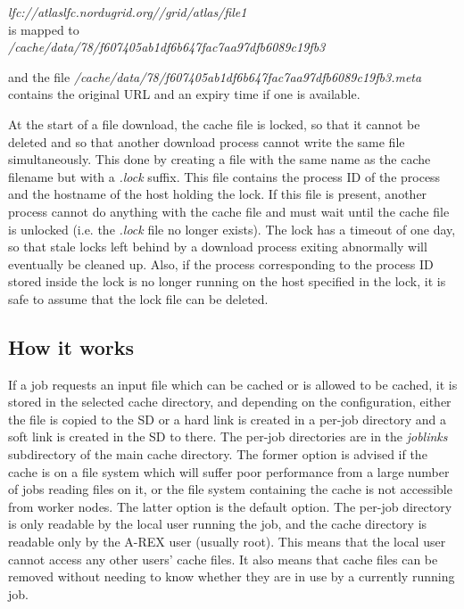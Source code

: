 \documentclass{article}                            %
\begin{document}
\begin{center}
\emph{lfc://atlaslfc.nordugrid.org//grid/atlas/file1 }\\
is mapped to\\
\emph{/cache/data/78/f607405ab1df6b647fac7aa97dfb6089c19fb3}
\par\end{center}

and the file \emph{/cache/data/78/f607405ab1df6b647fac7aa97dfb6089c19fb3.meta
}contains the original URL and an expiry time if one is available.

At the start of a file download, the cache file is locked, so that
it cannot be deleted and so that another download process cannot write
the same file simultaneously. This done by creating a file with the
same name as the cache filename but with a \emph{.lock} suffix. This
file contains the process ID of the process and the hostname of the
host holding the lock. If this file is present, another process cannot
do anything with the cache file and must wait until the cache file
is unlocked (i.e. the \emph{.lock} file no longer exists). The lock
has a timeout of one day, so that stale locks left behind by a download
process exiting abnormally will eventually be cleaned up. Also, if
the process corresponding to the process ID stored inside the lock
is no longer running on the host specified in the lock, it is safe
to assume that the lock file can be deleted.


\subsection{How it works}

If a job requests an input file which can be cached or is allowed to
be cached, it is stored in the selected cache directory, and depending
on the configuration, either the file is copied to the SD or a hard
link is created in a per-job directory and a soft link is created in
the SD to there. The per-job directories are in the \emph{joblinks}
subdirectory of the main cache directory. The former option is advised
if the cache is on a file system which will suffer poor performance
from a large number of jobs reading files on it, or the file system
containing the cache is not accessible from worker nodes. The latter
option is the default option. The per-job directory is only readable
by the local user running the job, and the cache directory is readable
only by the A-REX user (usually root). This means that the local user
cannot access any other users' cache files. It also means that cache
files can be removed without needing to know whether they are in use
by a currently running job.
\end{document}
